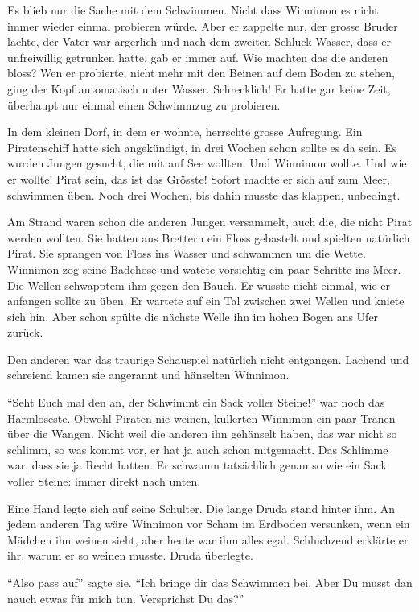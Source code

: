 Es blieb nur die Sache mit dem Schwimmen. Nicht dass Winnimon es nicht immer wieder einmal probieren würde. Aber er zappelte nur, der grosse Bruder lachte, der Vater war ärgerlich und nach dem zweiten Schluck Wasser, dass er unfreiwillig getrunken hatte, gab er immer auf. Wie machten das die anderen bloss? Wen er probierte, nicht mehr mit den Beinen auf dem Boden zu stehen, ging der Kopf automatisch unter Wasser. Schrecklich! Er hatte gar keine Zeit, überhaupt nur einmal einen Schwimmzug zu probieren.

In dem kleinen Dorf, in dem er wohnte, herrschte grosse Aufregung. Ein Piratenschiff hatte sich angekündigt, in drei Wochen schon sollte es da sein. Es wurden Jungen gesucht, die mit auf See wollten. Und Winnimon wollte. Und wie er wollte! Pirat sein, das ist das Grösste! Sofort machte er sich auf zum Meer, schwimmen üben. Noch drei Wochen, bis dahin musste das klappen, unbedingt. 

Am Strand waren schon die anderen Jungen versammelt, auch die, die nicht Pirat werden wollten. Sie hatten aus Brettern ein Floss gebastelt und spielten natürlich Pirat. Sie sprangen von Floss ins Wasser und schwammen um die Wette. Winnimon zog seine Badehose und watete vorsichtig ein paar Schritte ins Meer. Die Wellen schwapptem ihm gegen den Bauch. Er wusste nicht einmal, wie er anfangen sollte zu üben. Er wartete auf ein Tal zwischen zwei Wellen und kniete sich hin. Aber schon spülte die nächste Welle ihn im hohen Bogen ans Ufer zurück. 

Den anderen war das traurige Schauspiel natürlich nicht entgangen. Lachend und schreiend kamen sie angerannt und hänselten Winnimon.

\enquote{Seht Euch mal den an, der Schwimmt ein Sack voller Steine!} war noch das Harmloseste. Obwohl Piraten nie weinen, kullerten Winnimon ein paar Tränen über die Wangen. Nicht weil die anderen ihn gehänselt haben, das war nicht so schlimm, so was kommt vor, er hat ja auch schon mitgemacht. Das Schlimme war, dass sie ja Recht hatten. Er schwamm tatsächlich genau so wie ein Sack voller Steine: immer direkt nach unten.

Eine Hand legte sich auf seine Schulter. Die lange Druda stand hinter ihm. An jedem anderen Tag wäre Winnimon vor Scham im Erdboden versunken, wenn ein Mädchen ihn weinen sieht, aber heute war ihm alles egal. Schluchzend erklärte er ihr, warum er so weinen musste. Druda überlegte. 

\enquote{Also pass auf} sagte sie. \enquote{Ich bringe dir das Schwimmen bei. Aber Du musst dan nauch etwas für mich tun. Versprichst Du das?}

